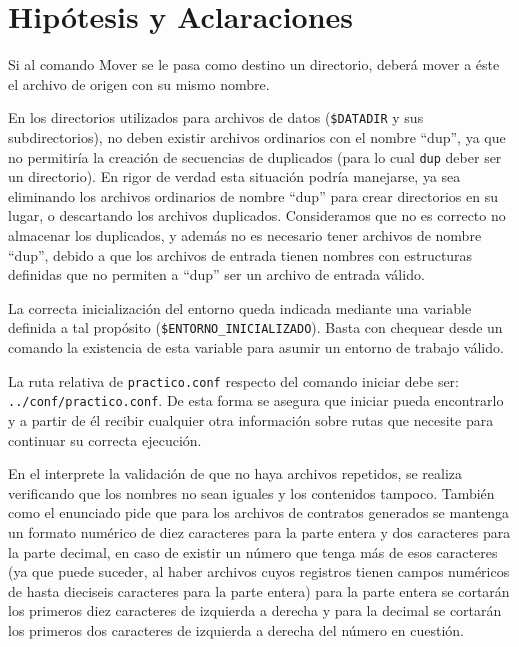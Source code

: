 \documentclass[12pt]{article}
\begin{document}
\tableofcontents
\thispagestyle{empty}
\clearpage

\section{Hipótesis y Aclaraciones}

Si al comando Mover se le pasa como destino un directorio, deberá mover a éste el archivo de origen con su mismo nombre.

En los directorios utilizados para archivos de datos (\verb|$DATADIR| y sus subdirectorios), no deben existir archivos ordinarios con el nombre ``dup'', ya que no permitiría la creación de secuencias de duplicados (para lo cual \verb|dup| deber ser un directorio). 
En rigor de verdad esta situación podría manejarse, ya sea eliminando los archivos ordinarios de nombre ``dup'' para crear directorios en su lugar, o descartando los archivos duplicados. 
Consideramos que no es correcto no almacenar los duplicados, y además no es necesario tener archivos de nombre ``dup'', debido a que los archivos de entrada tienen nombres con estructuras definidas que no permiten a ``dup'' ser un archivo de entrada válido.

La correcta inicialización del entorno queda indicada mediante una variable definida a tal propósito (\verb|$ENTORNO_INICIALIZADO|). Basta con chequear desde un comando la existencia de esta variable para asumir un entorno de trabajo válido.

La ruta relativa de \verb|practico.conf| respecto del comando iniciar debe ser: \verb|../conf/practico.conf|. De esta forma se asegura que iniciar pueda encontrarlo y a partir de él recibir cualquier otra información sobre rutas que necesite para continuar su correcta ejecución.

En el interprete la validación de que no haya archivos repetidos, se realiza verificando que los nombres no sean iguales y los contenidos tampoco. También como el enunciado pide que para los archivos de contratos generados se mantenga un formato numérico de diez caracteres para la parte entera y dos caracteres para la parte decimal, en caso de existir un número que tenga más de esos caracteres (ya que puede suceder, al haber archivos cuyos registros tienen campos numéricos de hasta dieciseis caracteres para la parte entera) para la parte entera se cortarán los primeros diez caracteres de izquierda a derecha y para la decimal se cortarán los primeros dos caracteres de izquierda a derecha del número en cuestión.
\end{document}
